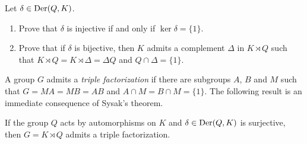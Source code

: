 \begin{exercise}
	\label{xca:ker1cocycle}
	Let $\delta\in\operatorname{Der}(Q,K)$. 
	\begin{enumerate}
	\item Prove that $\delta$ is injective if and only if 
	$\ker\delta=\{1\}$.
	\item Prove that if $\delta$ is bijective, then  
	$K$ admits a complement 
	$\Delta$ in $K\rtimes Q$ such that $K\rtimes Q=K\rtimes\Delta=\Delta Q$ and 
	$Q\cap\Delta=\{1\}$.
	\end{enumerate}
\end{exercise}


A group $G$ admits a {\em triple factorization} if there are subgroups 
$A$, $B$ and $M$ such that $G=MA=MB=AB$ and $A\cap M=B\cap M=\{1\}$.
The following result is an immediate consequence of Sysak's theorem.

\begin{corollary}
	If the group $Q$ acts by automorphisms on $K$ and $\delta\in\operatorname{Der}(Q,K)$ is
	surjective, then $G=K\rtimes Q$ admits a triple factorization. 
\end{corollary}




